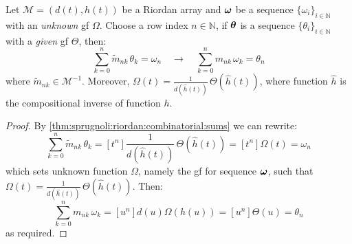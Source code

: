 \begin{theorem}
    Let $\mathcal{M}=(d(t),h(t))$ be a Riordan array and $\boldsymbol{\omega}$ 
    be a sequence $\lbrace\omega_{i}\rbrace_{i\in\mathbb{N}}$ with an \emph{unknown} 
    \ac{gf} $\Omega$. Choose a row index $n\in\mathbb{N}$, if $\boldsymbol{\theta}$ is a  
    sequence $\lbrace\theta_{i}\rbrace_{i\in\mathbb{N}}$ with a \emph{given} \ac{gf} $\Theta$, 
    then:
    \begin{displaymath}
        \sum_{k=0}^{n}{\tilde{m}_{nk}\,\theta_{k}}=\omega_{n}
        \quad\rightarrow\quad 
        \sum_{k=0}^{n}{m_{nk}\,\omega_{k}}=\theta_{n}
    \end{displaymath}
    where $\tilde{m}_{nk}\in\mathcal{M}^{-1}$. Moreover, 
    $\Omega(t)=\frac{1}{d(\hat{h}(t))}\,\Theta(\hat{h}(t))$,
    where function $\hat{h}$ is the compositional inverse of 
    function $h$.
    \label{thm:sprugnoli:sequences:inversion:by:combinatorial:sums}
\end{theorem}

\begin{proof}
    By \autoref{thm:sprugnoli:riordan:combinatorial:sums} we can rewrite:
    \begin{displaymath}
        \sum_{k=0}^{n}{\tilde{m}_{nk}\,\theta_{k}}
            = [t^{n}]\frac{1}{d(\hat{h}(t))}\,\Theta(\hat{h}(t)) 
            = [t^{n}]\Omega(t) = \omega_{n}
    \end{displaymath}
    which sets unknown function $\Omega$, namely the \ac{gf} for 
    sequence $\boldsymbol{\omega}$, such that $\Omega(t)=\frac{1}{d(\hat{h}(t))}\,\Theta(\hat{h}(t))$. 
    Then:
    \begin{displaymath}
        \sum_{k=0}^{n}{m_{nk}\,\omega_{k}}
            = [u^{n}]d(u)\Omega(h(u))
            = [u^{n}]\Theta(u)
            = \theta_{n}
    \end{displaymath}
    as required.
\end{proof}

